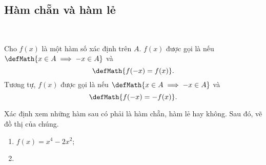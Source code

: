 \subsection{Hàm chẵn và hàm lẻ}

\ %

Cho $f(x)$ là một hàm số xác định trên $A$. $f(x)$ được gọi là  nếu $\defMath{x \in A \implies -x \in A}$ và $$\defMath{f(-x) = f(x)}.$$ Tương tự, $f(x)$ được gọi là  nếu $\defMath{x \in A \implies -x \in A}$ và $$\defMath{f(-x) = -f(x)}.$$

\exercise Xác định xem những hàm sau có phải là hàm chẵn, hàm lẻ hay không. Sau đó, vẽ đồ thị của chúng.
\begin{multicols}{2}
   \begin{enumerate}
      \item $f(x) = x^4 - 2x^2$;
      \item 
   \end{enumerate}
\end{multicols}